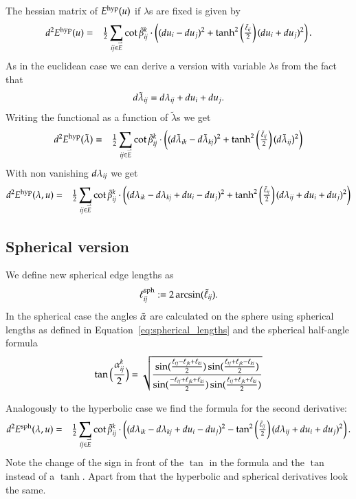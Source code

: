 \documentclass[Thesis]{subfiles}
\begin{document}
The hessian matrix of $E^{\rm hyp}(u)$ if $\lambda$s are fixed is given by
\begin{eqnarray*}
d^2E^{\rm hyp}(u)
&=&\tfrac{1}{2}\sum_{\it ij\in \accentset{\rightharpoonup}{E}} \cot\tilde{\beta}^k_{\it ij} \cdot \left((du_i-du_j)^2+
\tanh^2\left(\tfrac{\tilde \ell_{\it ij}}{2}\right)(du_i+du_j)^2\right).
\end{eqnarray*}
 As in the euclidean case we can derive a version with variable $\lambda$s from the fact that 
\begin{equation*}
d\tilde \lambda_{\it ij}=d\lambda_{\it ij}+du_i+du_j.
\end{equation*}
Writing the functional as a function of $\tilde \lambda$s we get 
\begin{eqnarray*}
 d^2E^{\rm hyp}(\tilde \lambda) &=&
 \tfrac{1}{2}\sum_{\it ij\in \accentset{\rightharpoonup}{E}} \cot\tilde{\beta}^k_{\it ij} \cdot \left((d\tilde\lambda_{\it ik}-d\tilde\lambda_{\it kj})^2+\tanh^2\left(\tfrac{\tilde \ell_{\it ij}}{2}\right)(d\tilde\lambda_{\it ij})^2\right)
\end{eqnarray*}
With non vanishing $d\lambda_{\it ij}$ we get
\begin{eqnarray*}
d^2E^{\rm hyp}(\lambda, u)
&=& \tfrac{1}{2}\sum_{\it ij\in \accentset{\rightharpoonup}{E}} \cot\tilde{\beta}^k_{\it ij} \cdot 
 \left((d\lambda_{\it ik}-d\lambda_{\it kj} +  du_i-du_j)^2+\tanh^2\left(\tfrac{\tilde \ell_{\it ij}}{2}\right)(d\lambda_{\it ij} +du_i+du_j)^2\right)
\end{eqnarray*}

\subsection{Spherical version}
\label{sec:spherical_fuctional}
We define new spherical edge lengths as 
\begin{equation}
\ell^{\rm sph}_{\it ij} := 2\arcsin(\tilde \ell_{\it ij}).\label{eq:spherical_lengths}
\end{equation}
In the spherical case the angles $\tilde{\alpha}$ are calculated on the sphere using spherical lengths as defined in 
Equation~\ref{eq:spherical_lengths} and the spherical half-angle formula
\[
  \tan\Big(\frac{\alpha^k_{\it ij}}{2}\Big)=
  \sqrt{\frac{
      \sin(\frac{\ell_{ij}-\ell_{jk}+\ell_{ki}}{2})
      \sin(\frac{\ell_{ij}+\ell_{jk}-\ell_{ki}}{2})
    }{
      \sin(\frac{-\ell_{ij}+\ell_{jk}+\ell_{ki}}{2})
      \sin(\frac{\ell_{ij}+\ell_{jk}+\ell_{ki}}{2})
    }}
\]

Analogously to the hyperbolic case we find the formula for the second derivative:
\begin{eqnarray*}
d^2E^{\rm sph}(\lambda, u)
&=& \tfrac{1}{2}\sum_{\it ij\in \accentset{\rightharpoonup}{E}} \cot\tilde{\beta}^k_{\it ij} \cdot 
 \left((d\lambda_{\it ik}-d\lambda_{\it kj} +  du_i-du_j)^2-\tan^2\left(\tfrac{\tilde \ell_{\it ij}}{2}\right)(d\lambda_{\it ij} +du_i+du_j)^2\right).
\end{eqnarray*}
Note the change of the sign in front of the $\tan$ in the formula and the $\tan$ instead of a $\tanh$. 
Apart from that the hyperbolic and spherical derivatives look the same.
\end{document}
